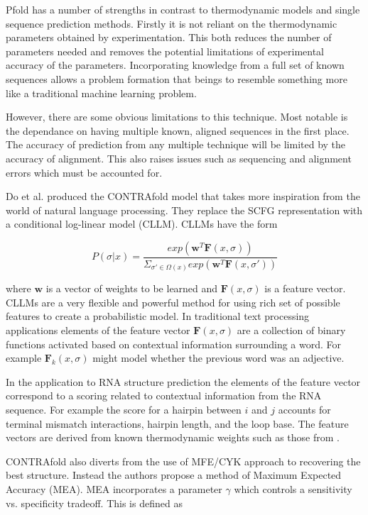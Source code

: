 \documentclass[journal]{IEEEtran}
\begin{document}
Pfold has a number of strengths in contrast to thermodynamic models and single sequence prediction methods. Firstly it is not reliant on the thermodynamic parameters obtained by experimentation. This both reduces the number of parameters needed and removes the potential limitations of experimental accuracy of the parameters. Incorporating knowledge from a full set of known sequences allows a problem formation that beings to resemble something more like a traditional machine learning problem.

However, there are some obvious limitations to this technique. Most notable is the dependance on having multiple known, aligned sequences in the first place. The accuracy of prediction from any multiple technique will be limited by the accuracy of alignment. This also raises issues such as sequencing and alignment errors which must be accounted for.

Do et al. \cite{do2006contrafold} produced the CONTRAfold model that takes more inspiration from the world of natural language processing. They replace the SCFG representation with a conditional log-linear model (CLLM). CLLMs have the form

\begin{equation}
	\label{eq:cllm}
	P(\sigma|x) = \frac{exp(\mathbf{w}^T \mathbf{F}(x, \sigma))}{\Sigma_{\sigma'\in \Omega(x)} exp(\mathbf{w}^T \mathbf{F}(x, \sigma'))} 
\end{equation}

where $\mathbf{w}$ is a vector of weights to be learned and $\mathbf{F}(x, \sigma)$ is a feature vector. CLLMs are a very flexible and powerful method for using rich set of possible features to create a probabilistic model. In traditional text processing applications elements of the feature vector $\mathbf{F}(x, \sigma)$ are a collection of binary functions activated based on contextual information surrounding a word. For example $\mathbf{F}_k(x, \sigma)$ might model whether the previous word was an adjective. 

In the application to RNA structure prediction the elements of the feature vector correspond to a scoring related to contextual information from the RNA sequence. For example the score for a hairpin between $i$ and $j$ accounts for terminal mismatch interactions, hairpin length, and the loop base. The feature vectors are derived from known thermodynamic weights such as those from \cite{mathews1999expanded}.

CONTRAfold also diverts from the use of MFE/CYK approach to recovering the best structure. Instead the authors propose a method of Maximum Expected Accuracy (MEA). MEA incorporates a parameter $\gamma$ which controls a sensitivity vs. specificity tradeoff. This is defined as
\end{document}
